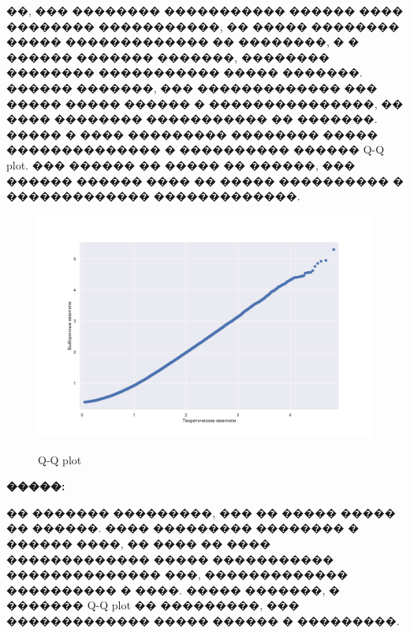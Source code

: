 \indent ��, ��� �������� ����������� ������ ���� �������� �����������, �� ����� �������� ����� ������������� �� ��������, � � ������ ������� �������, �������� �������� ����������� ����� �������.
������ �������, ��� ������������� ��� ����� ����� ������ � ���������������, �� ���� �������� ����������� �� �������. ����� � ���� ��������� �������� ����� �������������� � ���������� ������ Q-Q plot. ��� ������ �� ����� �� ������, ��� ������ ������ ���� �� ����� ���������� � ������������� �������������.
\begin{figure}[!h]
{\includegraphics[width=1\linewidth]{qqplot}}
    \caption{Q-Q plot}
\end{figure}


\textbf{�����:}

�� ������� ���������, ��� �� ����� ����� �� ������. ���� ��������� �������� � ������ ����, �� ���� �� ���� ������������� ����� ����������� �������������� ���, ������������� ���������� � ����.
����� �������, � ������� Q-Q plot �� ���������, ��� ������������� ����� ������ � ���������.

